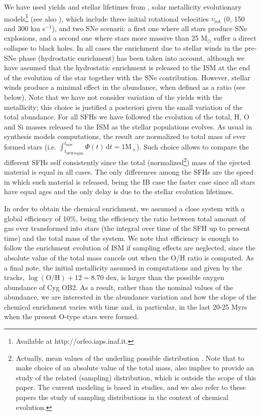\documentclass{aa} %
\begin{document}
We have used yields and stellar lifetimes from \cite{LC18}, solar metallicity evolutionary models\footnote{Available at http://orfeo.iaps.inaf.it.} (see also \citealt{prantzos18}), which include three initial rotational velocities $v_\mathrm{rot}$ (0, 150 and 300 km s$^{-1}$), and two SNe scenarii: a first one where all stars produce SNe explosions, and a second one where stars more massive than 25 $\mathrm{M}_{\odot}$ suffer a direct collapse to black holes. In all cases the enrichment due to stellar winds in the pre-SNe phase (hydrostatic enrichment) has been taken into account, although we have assumed that the hydrostatic enrichment is released to the ISM at the end of the evolution of the star together with the SNe contribution. However, stellar winds produce a minimal effect in the abundance, when defined as a ratio (see below). Note that we have not consider variation of the yields with the metallicity; this choice is justified a posteriori given the small variation of the total abundance. For all SFHs we have followed the evolution of the total, H, O and Si masses released to the ISM as the stellar populations evolves. As usual in synthesis models computations, the result are normalized to total mass of ever formed stars (i.e. $\int^{t_\mathrm{now}}_{t_\mathrm{SFH\,begins}} \Phi(t)\, \mathrm{d}t = 1 \mathrm{M}_\sun$). Such choice allows to compare the different SFHs self consistently since the total (normalized\footnote{Actually, mean values of the underling possible distribution \citep{CL06}. Note that to make choice of an absolute value of the total mass, also implies to provide an study of the related (sampling) distribution, which is outside the scope of this paper. The current modeling is based in \cite{Cetal01,CM02} studies, and we also refer to these papers the study of sampling distributions in the context of chemical evolution.}) mass of the ejected material is equal in all cases. The only differences among the SFHs are the speed in which such material is released, being the IB case the faster case since all stars have equal ages and the only delay is due to the stellar evolution lifetimes.


In order to obtain the chemical enrichment, we assumed a close system with a global efficiency of 10\%, being the efficiency the ratio between total amount of gas ever transformed into stars (the integral over time of the SFH up to present time) and the total mass of the system. 
We note that efficiency is enough to follow the enrichment evolution of ISM if sampling effects are neglected, since the absolute value of the total mass cancels out when the O/H ratio is computed.
As a final note, the initial metallicity assumed in computations and given by the tracks, $\log(\mathrm{O}/\mathrm{H}) + 12 = 8.70$ dex, is larger than the possible oxygen abundance of Cyg OB2. As a result, rather than the nominal values of the abundance, we are interested in the abundance variation and how the slope of the chemical enrichment varies with time and, in particular,  in the last 20-25 Myrs when the present O-type stars were formed.
\end{document}
